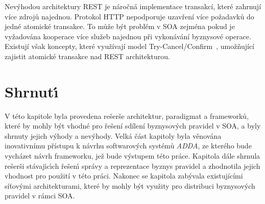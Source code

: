 Nevýhodou architektury \gls{REST} je náročná implementace transakcí, které zahrnují více
zdrojů najednou. Protokol \gls{HTTP} nepodporuje uzavření více požadavků do jedné atomické
transakce. To může být problém v \gls{SOA} zejména pokud je vyžadována kooperace více služeb
najednou při vykonávání byznysové operace. Existují však koncepty, které využívají model
Try-Cancel/Confirm~\cite{pardon2011towards}, umožňující zajistit atomické transakce nad
\gls{REST} architekturou.

\section{Shrnut\'{\i}}

V této kapitole byla provedena rešerše architektur, paradigmat a frameworků, které by mohly být vhodné
pro řešení sdílení byznysových pravidel v \gls{SOA}, a byly shrnuty jejich v\'yhody a nev\'yhody.
Velká část kapitoly byla věnována inovativnímu přístupu k návrhu softwarov\'ych systémů \textit{ADDA},
ze kterého bude vycházet návrh frameworku, jež bude výstupem této práce.
Kapitola dále shrnula rešerši stávaj\'{\i}c\'{\i}ch řešen\'{\i} správy a reprezentace byznys pravidel
a zhodnotila jejich vhodnost pro použití v této práci. Nakonec se kapitola zabývala existujícími
síťovými architekturami, které by mohly být využity pro distribuci byznysových pravidel v rámci \gls{SOA}.
